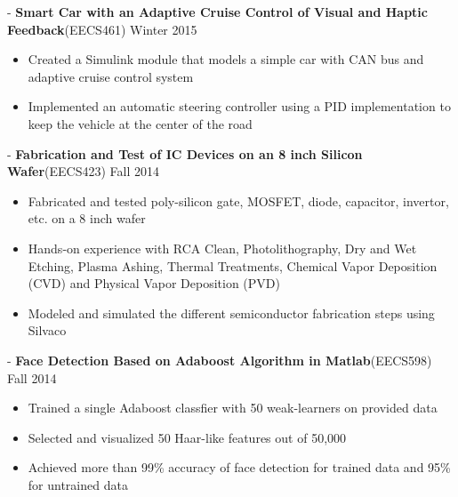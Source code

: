 \documentclass[11pt]{res}
\begin{document}
\begin{resume}
  -\sectionwidth \resumewidth  
\textbf{Smart Car with an Adaptive Cruise Control of Visual and Haptic Feedback}{(EECS461)}   \hfill{Winter 2015}  \hspace{-0.58in}\vspace{-0mm}\\
  \vspace{-14pt}
 \begin{itemize}[leftmargin=-0.1in]
  \item Created a Simulink module that models a simple car with CAN bus and adaptive cruise control system  \vspace{-5pt}
  \item Implemented an automatic steering controller using a PID implementation to keep the vehicle at the center of the road  \vspace{-3pt}
   \end{itemize}\vspace{-10pt}
     
 -\sectionwidth \resumewidth
\textbf{Fabrication and Test of IC Devices on an 8 inch Silicon Wafer}{(EECS423)}   \hfill{Fall 2014}  \hspace{-0.58in}\vspace{-0mm}\\
\vspace{-14pt}
\begin{itemize}[leftmargin=-0.1in]
\item Fabricated and tested poly-silicon gate, MOSFET, diode, capacitor, invertor, etc. on a 8 inch wafer \vspace{-5pt}
\item Hands-on experience with RCA Clean, Photolithography, Dry and Wet Etching, Plasma Ashing, Thermal Treatments, Chemical Vapor Deposition (CVD) and Physical Vapor Deposition (PVD) \vspace{-5pt}
\item Modeled and simulated the different semiconductor fabrication steps using Silvaco \vspace{-3pt}
\end{itemize}\vspace{-10pt}

 -\sectionwidth \resumewidth
\textbf{Face Detection Based on Adaboost Algorithm in Matlab}{(EECS598)}   \hfill{Fall 2014}  \hspace{-0.58in}\vspace{-0mm}\\
\vspace{-14pt}
 \begin{itemize}[leftmargin=-0.1in]
  \item Trained a single Adaboost classfier with 50 weak-learners on provided data  \vspace{-5pt}
  \item Selected and visualized 50 Haar-like features out of 50,000\vspace{-5pt}
  \item Achieved more than 99\% accuracy of face detection for trained data and 95\% for untrained data\vspace{-3pt}
  \end{itemize}\vspace{-10pt}


\end{resume}
\end{document}

